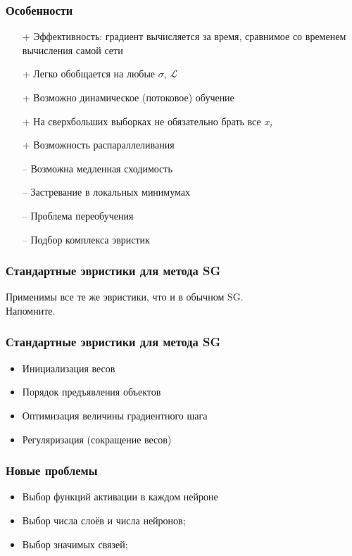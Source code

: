 \documentclass[10pt]{beamer}
\begin{document}
\begin{frame}\frametitle{Особенности}
	\begin{enumerate}[<+->]
	\item[+] Эффективность: градиент вычисляется за время, сравнимое со временем вычисления самой сети
	\item[+] Легко обобщается на любые $\sigma$, $\mathcal{L}$
	\item[+] Возможно динамическое (потоковое) обучение
	\item[+] На сверхбольших выборках не обязательно брать все $x_i$
	\item[+] Возможность распараллеливания
	\bigbreak
	\item[--] Возможна медленная сходимость
	\item[--] Застревание в локальных минимумах
	\item[--] Проблема переобучения
	\item[--] Подбор комплекса эвристик
	\end{enumerate}
\end{frame}


\begin{frame}\frametitle{Стандартные эвристики для метода SG}
	Применимы все те же эвристики, что и в обычном SG.\\
	\bigbreak
	\pause
	Напомните.
\end{frame}

\begin{frame}\frametitle{Стандартные эвристики для метода SG}
	\begin{itemize}[<+->]
		\item Инициализация весов
		\item Порядок предъявления объектов
		\item Оптимизация величины градиентного шага
		\item Регуляризация (сокращение весов)
	\end{itemize}
\end{frame}

\begin{frame}\frametitle{Новые проблемы}
	\begin{itemize}[<+->]
		\item Выбор функций активации в каждом нейроне
		\item Выбор числа слоёв и числа нейронов;
		\item Выбор значимых связей;
	\end{itemize}
\end{frame}
\end{document}
